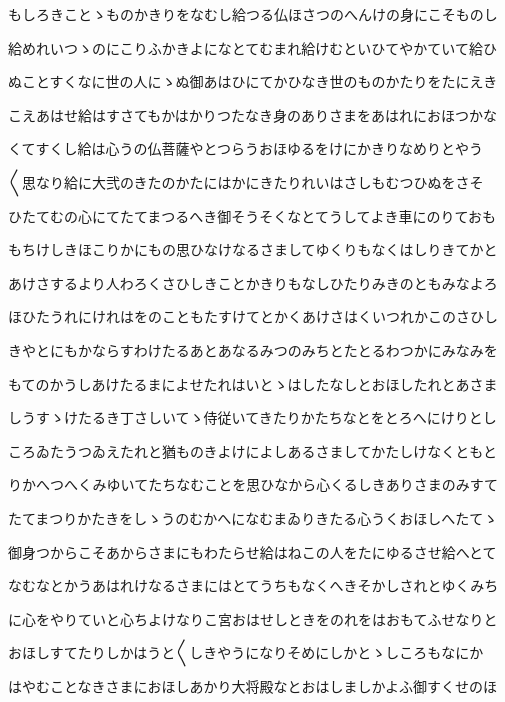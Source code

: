 \documentclass[a4paper,11pt,landscape]{ltjtarticle}
\begin{document}
\par\medskip
もしろきことゝものかきりをなむし給つる仏ほさつのへんけの身にこそものし
\par\medskip
給めれいつゝのにこりふかきよになとてむまれ給けむといひてやかていて給ひ
\par\medskip
ぬことすくなに世の人にゝぬ御あはひにてかひなき世のものかたりをたにえき
\par\medskip
こえあはせ給はすさてもかはかりつたなき身のありさまをあはれにおほつかな
\par\medskip
くてすくし給は心うの仏菩薩やとつらうおほゆるをけにかきりなめりとやう
\par\medskip
〱思なり給に大弐のきたのかたにはかにきたりれいはさしもむつひぬをさそ
\par\medskip
ひたてむの心にてたてまつるへき御そうそくなとてうしてよき車にのりておも
\par\medskip
もちけしきほこりかにもの思ひなけなるさましてゆくりもなくはしりきてかと
\par\medskip
あけさするより人わろくさひしきことかきりもなしひたりみきのともみなよろ
\par\medskip
ほひたうれにけれはをのこともたすけてとかくあけさはくいつれかこのさひし
\par\medskip
きやとにもかならすわけたるあとあなるみつのみちとたとるわつかにみなみを
\par\medskip
もてのかうしあけたるまによせたれはいとゝはしたなしとおほしたれとあさま
\par\medskip
しうすゝけたるき丁さしいてゝ侍従いてきたりかたちなとをとろへにけりとし
\par\medskip
ころゐたうつゐえたれと猶ものきよけによしあるさましてかたしけなくともと
\par\medskip
りかへつへくみゆいてたちなむことを思ひなから心くるしきありさまのみすて
\par\medskip
たてまつりかたきをしゝうのむかへになむまゐりきたる心うくおほしへたてゝ
\par\medskip
御身つからこそあからさまにもわたらせ給はねこの人をたにゆるさせ給へとて
\par\medskip
なむなとかうあはれけなるさまにはとてうちもなくへきそかしされとゆくみち
\par\medskip
に心をやりていと心ちよけなりこ宮おはせしときをのれをはおもてふせなりと
\par\medskip
おほしすてたりしかはうと〱しきやうになりそめにしかとゝしころもなにか
\par\medskip
はやむことなきさまにおほしあかり大将殿なとおはしましかよふ御すくせのほ
\par\medskip
\end{document}
